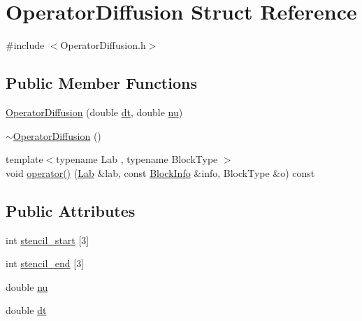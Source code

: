 \hypertarget{struct_operator_diffusion}{}\section{Operator\+Diffusion Struct Reference}
\label{struct_operator_diffusion}


{\ttfamily \#include $<$Operator\+Diffusion.\+h$>$}

\subsection*{Public Member Functions}
\begin{DoxyCompactItemize}
\item 
\hyperlink{struct_operator_diffusion_a661c391953ea4ecab75d089124b4db24}{Operator\+Diffusion} (double \hyperlink{struct_operator_diffusion_a8255ce1ebd90d30c4e4ec015280ae6ad}{dt}, double \hyperlink{struct_operator_diffusion_a332291d966d2088dc6f9183751975a3a}{nu})
\item 
\hyperlink{struct_operator_diffusion_a32224246dc49919bb24dbb9798492c7d}{$\sim$\+Operator\+Diffusion} ()
\item 
{\footnotesize template$<$typename Lab , typename Block\+Type $>$ }\\void \hyperlink{struct_operator_diffusion_a38cb92587b86ed70af0ea263e35fec0b}{operator()} (\hyperlink{_definitions_8h_ad6f951af9a2a6ebc1975404882b34314}{Lab} \&lab, const \hyperlink{struct_block_info}{Block\+Info} \&info, Block\+Type \&o) const 
\end{DoxyCompactItemize}
\subsection*{Public Attributes}
\begin{DoxyCompactItemize}
\item 
int \hyperlink{struct_operator_diffusion_a023c363d73e84e0a06be766a0aad85c6}{stencil\+\_\+start} \mbox{[}3\mbox{]}
\item 
int \hyperlink{struct_operator_diffusion_a42d733e46348f1fea002dfaa48913042}{stencil\+\_\+end} \mbox{[}3\mbox{]}
\item 
double \hyperlink{struct_operator_diffusion_a332291d966d2088dc6f9183751975a3a}{nu}
\item 
double \hyperlink{struct_operator_diffusion_a8255ce1ebd90d30c4e4ec015280ae6ad}{dt}
\end{DoxyCompactItemize}



